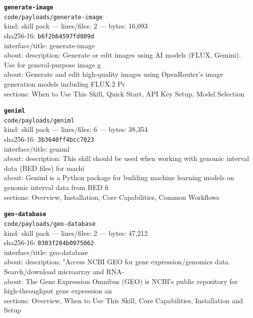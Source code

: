 \noindent\textbf{\texttt{generate-image}}\\
\texttt{code/payloads/generate-image}\\
kind: skill pack --- lines/files: 2 --- bytes: 16,093\\
sha256-16: \texttt{b6f2b64597fd809d}\\
interface/title: generate-image\\
about: description: Generate or edit images using AI models (FLUX, Gemini). Use for general-purpose image g\\
about: Generate and edit high-quality images using OpenRouter's image generation models including FLUX.2 Pr\\
sections: When to Use This Skill, Quick Start, API Key Setup, Model Selection\\
\vspace*{6.0pt}
\newpage

\noindent\textbf{\texttt{geniml}}\\
\texttt{code/payloads/geniml}\\
kind: skill pack --- lines/files: 6 --- bytes: 38,354\\
sha256-16: \texttt{3b3640ff4bcc7023}\\
interface/title: geniml\\
about: description: This skill should be used when working with genomic interval data (BED files) for machi\\
about: Geniml is a Python package for building machine learning models on genomic interval data from BED fi\\
sections: Overview, Installation, Core Capabilities, Common Workflows\\
\vspace*{6.0pt}

\noindent\textbf{\texttt{geo-database}}\\
\texttt{code/payloads/geo-database}\\
kind: skill pack --- lines/files: 2 --- bytes: 47,212\\
sha256-16: \texttt{0383f284b0975062}\\
interface/title: geo-database\\
about: description: "Access NCBI GEO for gene expression/genomics data. Search/download microarray and RNA-\\
about: The Gene Expression Omnibus (GEO) is NCBI's public repository for high-throughput gene expression an\\
sections: Overview, When to Use This Skill, Core Capabilities, Installation and Setup\\
\vspace*{6.0pt}

